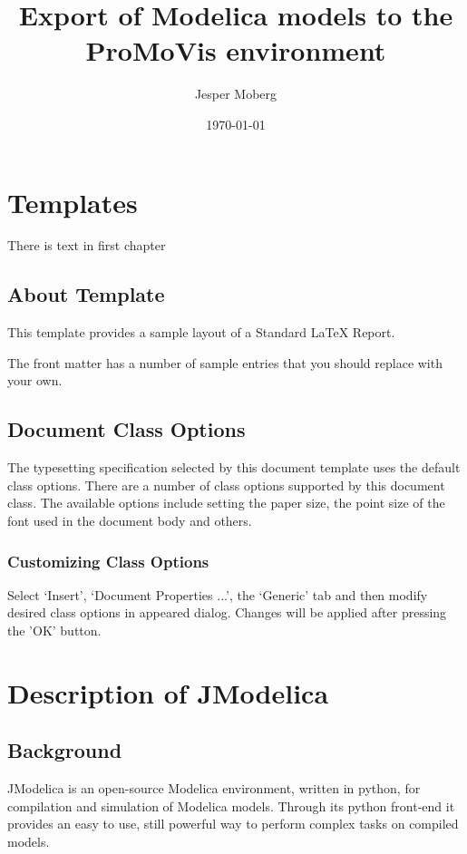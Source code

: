 \documentclass{report}
\begin{document}
\title{\Huge\bf Export of Modelica models to the ProMoVis environment}
\author{Jesper Moberg}
\date{\today}
\maketitle

\tableofcontents

\chapter{Templates}
There is text in first chapter

\section{About Template}
This template provides a sample layout of a Standard \LaTeX{} Report.

The front matter has a number of sample entries that you should replace
with your own. 

\section{Document Class Options}
The typesetting specification selected by this document template
uses the default class options. There are a number of class options 
supported by this document class. The available options include 
setting the paper size, the point size of the font used in the 
document body and others.

\subsection{Customizing Class Options}
Select `Insert', `Document Properties ...', the `Generic' tab
and then modify desired class options in appeared dialog.
Changes will be applied after pressing the 'OK' button.
\chapter {Description of JModelica}
\section{Background}
JModelica is an open-source Modelica environment, written in python,  for compilation and simulation of Modelica models. Through its python front-end it provides an easy to use, still powerful way to perform complex tasks on compiled models. 
\end{document}
